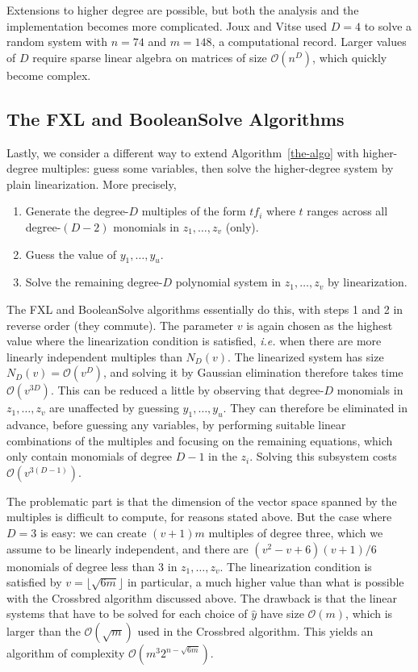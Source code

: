 \documentclass[a4paper,UKenglish,cleveref, autoref]{lipics-v2019}
\newcommand{\bigO}[1]{\ensuremath{\mathcal{O}\left( #1 \right)} }
\begin{document}
Extensions to higher degree are possible, but both the analysis and the
implementation becomes more complicated. Joux and Vitse used $D=4$ to solve a
random system with $n=74$ and $m=148$, a computational record. Larger values of
$D$ require sparse linear algebra on matrices of size $\bigO{n^D}$, which
quickly become complex.


\subsection{The \textsf{FXL} and \textsf{BooleanSolve} Algorithms}

Lastly, we consider a different way to extend Algorithm~\ref{the-algo} with
higher-degree multiples: guess some variables, then solve the higher-degree
system by plain linearization. More precisely,

\begin{enumerate}
\item Generate the degree-$D$ multiples of the form $t f_i$ where $t$ ranges
  across all degree-$(D-2)$ monomials in $z_1, \dots, z_v$ (only).
  
\item Guess the value of $y_1, \dots, y_u$.
  
\item Solve the remaining degree-$D$ polynomial system in $z_1, \dots, z_v$ by
  linearization.
\end{enumerate}

The \textsf{FXL} and \textsf{BooleanSolve} algorithms essentially do this, with
steps 1 and 2 in reverse order (they commute). The parameter $v$ is again chosen
as the highest value where the linearization condition is satisfied,
\textit{i.e.} when there are more linearly independent multiples than
$N_D(v)$. The linearized system has size $N_D(v) = \bigO{v^D}$, and solving it
by Gaussian elimination therefore takes time $\bigO{v^{3D}}$. This can be
reduced a little by observing that degree-$D$ monomials in $z_1, \dots, z_v$ are
unaffected by guessing $y_1, \dots, y_u$. They can therefore be eliminated in
advance, before guessing any variables, by performing suitable linear
combinations of the multiples and focusing on the remaining equations, which
only contain monomials of degree $D-1$ in the $z_i$. Solving this subsystem
costs $\bigO{v^{3(D-1)}}$.

The problematic part is that the dimension of the vector space spanned by the
multiples is difficult to compute, for reasons stated above. But the case where
$D=3$ is easy: we can create $(v+1)m$ multiples of degree three, which we assume
to be linearly independent, and there are $(v^2 - v + 6)(v + 1)/6$ monomials of
degree less than 3 in $z_1, \dots, z_v$. The linearization condition is
satisfied by $v = \lfloor \sqrt{6m} \rfloor$ in particular, a much higher value
than what is possible with the \textsf{Crossbred} algorithm discussed above. The
drawback is that the linear systems that have to be solved for each choice of
$\hat y$ have size $\bigO{m}$, which is larger than the $\bigO{\sqrt{m}}$ used
in the \textsf{Crossbred} algorithm. This yields an algorithm of complexity
$\bigO{m^3 2^{n - \sqrt{6m}}}$.
\end{document}
